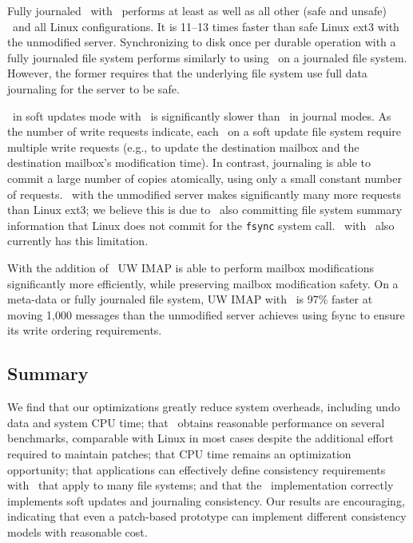 Fully journaled \Kudos\ with \patchgroups\ performs at least as well
as all other (safe and unsafe) \Kudos\ and all Linux configurations.
It is 11--13 times faster than safe Linux ext3 with the unmodified
server.
%
Synchronizing to disk once per durable operation with a fully
journaled file system performs similarly to using \patchgroups\ on a
journaled file system. However, the former requires that the
underlying file system use full data journaling for the server to be
safe.

\Kudos\ in soft updates mode with \patchgroups\ is significantly
slower than \Kudos\ in journal modes. As the number of write requests
indicate, each \patchgroup\ on a soft update file system require
multiple write requests (e.g., to update the destination mailbox and
the destination mailbox's modification time). In contrast, journaling
is able to commit a large number of copies atomically, using only a
small constant number of requests.
%
\Kudos\ with the unmodified server makes significantly many more
requests than Linux ext3; we believe this is due to \Kudos\ also
committing file system summary information that Linux does not commit
for the \texttt{fsync} system call. \Kudos\ with \patchgroups\
also currently has this limitation.

With the addition of \patchgroups\ UW IMAP is able to perform mailbox
modifications significantly more efficiently, while preserving mailbox
modification safety. On a meta-data or fully journaled file system, UW
IMAP with \patchgroups\ is 97\% faster at moving 1,000 messages than
the unmodified server achieves using fsync to ensure its write
ordering requirements.


\subsection{Summary}
\label{sec:evaluation:summary}

We find
%
that our optimizations greatly reduce system overheads, including
undo data and system CPU time;
%
that \Kudos\ obtains reasonable performance on several benchmarks,
comparable with Linux in most cases despite the additional effort required
to maintain patches;
%
that CPU time remains an optimization opportunity;
%
that applications can effectively define consistency requirements with
\patchgroups\ that apply to many file systems;
%
and that the \Kudos\ implementation correctly
implements soft updates and journaling consistency.
%
Our results are encouraging, indicating that even a patch-based prototype
can implement different consistency models with reasonable cost.
